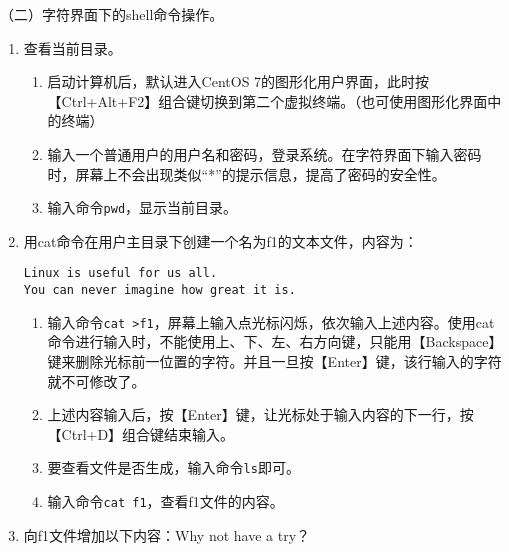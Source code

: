 \vspace{0.1in}
（二）字符界面下的shell命令操作。
\begin{enumerate}
  \item 查看当前目录。
    \begin{enumerate}
      \item 启动计算机后，默认进入CentOS 7的图形化用户界面，此时按【Ctrl+Alt+F2】组合键切换到第二个虚拟终端。（也可使用图形化界面中的终端）
      \item 输入一个普通用户的用户名和密码，登录系统。在字符界面下输入密码时，屏幕上不会出现类似“*”的提示信息，提高了密码的安全性。
      \item 输入命令\verb|pwd|，显示当前目录。
    \end{enumerate}
  \item 用cat命令在用户主目录下创建一个名为f1的文本文件，内容为：
\begin{verbatim}
Linux is useful for us all.
You can never imagine how great it is.
\end{verbatim}
    \begin{enumerate}
      \item 输入命令\verb|cat >f1|，屏幕上输入点光标闪烁，依次输入上述内容。使用cat命令进行输入时，不能使用上、下、左、右方向键，只能用【Backspace】键来删除光标前一位置的字符。并且一旦按【Enter】键，该行输入的字符就不可修改了。
      \item 上述内容输入后，按【Enter】键，让光标处于输入内容的下一行，按【Ctrl+D】组合键结束输入。
      \item 要查看文件是否生成，输入命令\verb|ls|即可。
      \item 输入命令\verb|cat f1|，查看f1文件的内容。
    \end{enumerate}
  \item 向f1文件增加以下内容：Why not have a try？


\end{enumerate}
